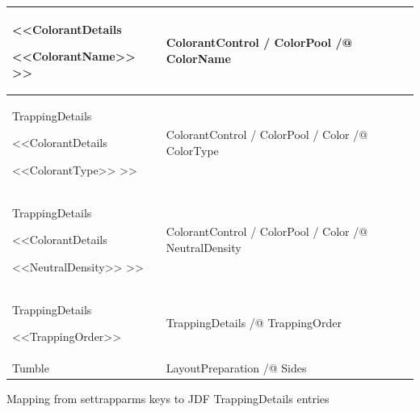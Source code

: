 \documentclass[letterpaper,12pt,english,openany,oneside]{sphinxmanual}
\begin{document}
\begin{savenotes}
\begin{tabulary}{\linewidth}[t]{|T|T|}
<<ColorantDetails

<<ColorantName>> >>
&
ColorantControl / ColorPool /@ ColorName
\\
\hline
TrappingDetails

<<ColorantDetails

<<ColorantType>> >>
&
ColorantControl / ColorPool / Color /@ ColorType
\\
\hline
TrappingDetails

<<ColorantDetails

<<NeutralDensity>> >>
&
ColorantControl / ColorPool / Color /@ NeutralDensity
\\
\hline
TrappingDetails

<<TrappingOrder>>
&
TrappingDetails /@ TrappingOrder
\\
\hline
Tumble
&
LayoutPreparation /@ Sides
\\
\hline
\end{tabulary}
\par
\sphinxattableend\end{savenotes}

Mapping from settrapparms keys to JDF TrappingDetails entries
\end{document}

